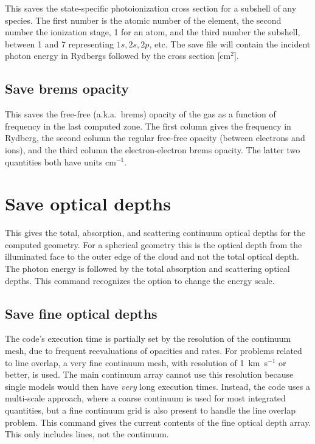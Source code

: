 This saves the state-specific photoionization cross section for a
subshell of any species.  The first number is the atomic number of the
element, the second number the ionization stage, 1 for an atom, and the
third number the subshell, between 1 and 7 representing $1s, 2s, 2p$, etc.
The save file will contain the incident photon energy in Rydbergs
followed by the cross section [cm$^2$].

\subsection{Save brems opacity}

This saves the free-free (a.k.a.\ brems) opacity of the gas as a function of
frequency in the last computed zone. The first column gives the frequency in
Rydberg, the second column the regular free-free opacity (between electrons
and ions), and the third column the electron-electron brems opacity. The
latter two quantities both have units cm$^{-1}$.

\section{Save optical depths}

This gives the total, absorption, and scattering continuum optical depths
for the computed geometry.  For a spherical geometry this is the optical
depth from the illuminated face to the outer edge of the cloud and not the
total optical depth.  The photon energy is followed by the total absorption
and scattering optical depths.
This command recognizes the  option
to change the energy scale.

\subsection{Save fine optical depths}

The code's execution time is partially set by the resolution of the
continuum mesh, due to frequent reevaluations of opacities and rates.
For problems related to line overlap, a very fine continuum mesh, with resolution
of 1~km~s$^{-1}$ or better, is used.
The main continuum array cannot use this
resolution because single models would then have \emph{very} long execution times.
Instead, the code uses a multi-scale approach, where a coarse continuum
is used for most integrated quantities, but a fine continuum grid is also
present to handle the line overlap problem.  This command gives the current
contents of the fine optical depth array.  This only includes lines, not
the continuum.

